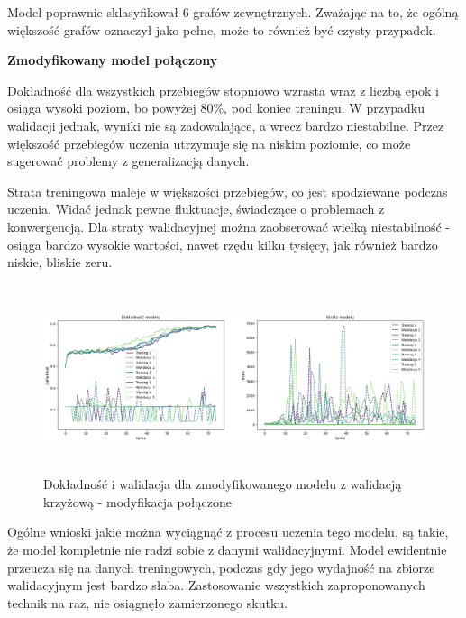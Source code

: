 Model poprawnie sklasyfikował 6 grafów zewnętrznych.
Zważając na to, że ogólną większość grafów oznaczył jako pełne, może to również być czysty przypadek. 

\textbf{Zmodyfikowany model połączony}

Dokładność dla wszystkich przebiegów stopniowo wzrasta wraz z liczbą epok
i osiąga wysoki poziom, bo powyżej 80\%, pod koniec treningu.
W przypadku walidacji jednak, wyniki nie są zadowalające, a wrecz bardzo niestabilne.
Przez większość przebiegów uczenia utrzymuje się na niskim poziomie,
co może sugerować problemy z generalizacją danych.

Strata treningowa maleje w większości przebiegów, co jest spodziewane podczas uczenia.
Widać jednak pewne fluktuacje, świadczące o problemach z konwergencją.
Dla straty walidacyjnej można zaobserować wielką niestabilność - osiąga bardzo wysokie wartości,
nawet rzędu kilku tysięcy, jak również bardzo niskie, bliskie zeru.

\begin{figure}[ht]
	\centering
	\includegraphics[height=5.5cm]{resources/tests/images/v4/crossvalid_img.png}
	\caption{Dokładność i walidacja dla zmodyfikowanego modelu z walidacją krzyżową - modyfikacja połączone}
	\label{Fig:tests-cv-5a}
\end{figure}
\FloatBarrier

Ogólne wnioski jakie można wyciągnąć z procesu uczenia tego modelu,
są takie, że model kompletnie nie radzi sobie z danymi walidacyjnymi.
Model ewidentnie przeucza się na danych treningowych,
podczas gdy jego wydajność na zbiorze walidacyjnym jest bardzo słaba.
Zastosowanie wszystkich zaproponowanych technik na raz,
nie osiągnęło zamierzonego skutku. 

